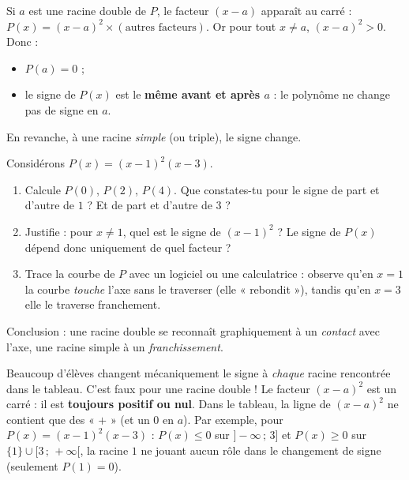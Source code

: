 \documentclass[11pt]{article}
\newcommand{\cle}[1]{{\popxbold\color{popdark}#1}}
\newcounter{popsec}
\newcounter{popsub}
\newcommand{\courssub}[1]{%
  \stepcounter{popsub}%
  \par\vspace{9pt}\noindent{\popxbold\fontsize{11.5}{13}\selectfont\color{popink}{\color{poporange}\thepopsec.\thepopsub}\hspace{6pt}#1}\par\nopagebreak\vspace{4pt}
}
\begin{document}
\courssub{Le cas des racines multiples}

\begin{propriete}
Si $a$ est une \cle{racine double} de $P$, le facteur $(x-a)$ apparaît au carré : $P(x) = (x-a)^2 \times (\text{autres facteurs})$. Or pour tout $x \neq a$, $(x-a)^2 > 0$. Donc :
\begin{itemize}
\item $P(a) = 0$ ;
\item le signe de $P(x)$ est le \textbf{même avant et après $a$} : le polynôme ne change pas de signe en $a$.
\end{itemize}
En revanche, à une racine \emph{simple} (ou triple), le signe change.
\end{propriete}

\begin{experience}
Considérons $P(x) = (x-1)^2(x-3)$.
\begin{enumerate}
\item Calcule $P(0)$, $P(2)$, $P(4)$. Que constates-tu pour le signe de part et d'autre de $1$ ? Et de part et d'autre de $3$ ?
\item Justifie : pour $x \neq 1$, quel est le signe de $(x-1)^2$ ? Le signe de $P(x)$ dépend donc uniquement de quel facteur ?
\item Trace la courbe de $P$ avec un logiciel ou une calculatrice : observe qu'en $x = 1$ la courbe \emph{touche} l'axe sans le traverser (elle « rebondit »), tandis qu'en $x = 3$ elle le traverse franchement.
\end{enumerate}
Conclusion : une racine double se reconnaît graphiquement à un \emph{contact} avec l'axe, une racine simple à un \emph{franchissement}.
\end{experience}

\begin{attention}
Beaucoup d'élèves changent mécaniquement le signe à \emph{chaque} racine rencontrée dans le tableau. C'est faux pour une racine double ! Le facteur $(x-a)^2$ est un carré : il est \textbf{toujours positif ou nul}. Dans le tableau, la ligne de $(x-a)^2$ ne contient que des « $+$ » (et un $0$ en $a$). Par exemple, pour $P(x) = (x-1)^2(x-3)$ : $P(x) \leq 0$ sur $]-\infty\,;\,3]$ et $P(x) \geq 0$ sur $\{1\} \cup [3\,;\,+\infty[$, la racine $1$ ne jouant aucun rôle dans le changement de signe (seulement $P(1) = 0$).
\end{attention}
\end{document}
